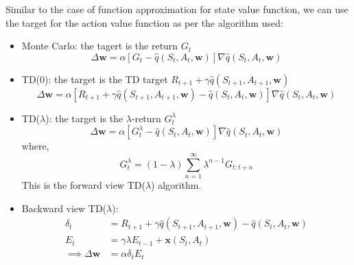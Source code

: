 Similar to the case of function approximation for state value function, we can use the target
for the action value function as per the algorithm used:
\begin{itemize}
    \item Monte Carlo: the tagert is the return \(G_t\)
    \[
        \Delta \mathbf{w} = \alpha \left[ 
            G_t - \hat{q}(S_t,A_t,\mathbf{w})
         \right] \nabla \hat{q}(S_t,A_t,\mathbf{w})  
    \]
    \item TD(0): the target is the TD target \(R_{t+1} + \gamma \hat{q}(S_{t+1},A_{t+1},
    \mathbf{w})\)
    \[
        \Delta \mathbf{w} = \alpha \left[ 
            R_{t+1} + \gamma \hat{q}(S_{t+1},A_{t+1},\mathbf{w}) - \hat{q}(S_t,A_t,
            \mathbf{w})
         \right] \nabla \hat{q}(S_t,A_t,\mathbf{w})
    \]
    \item TD(\(\lambda\)): the target is the \(\lambda\)-return  \(G_t^{\lambda}\)
    \[
        \Delta \mathbf{w} = \alpha \left[ 
            G_t^{\lambda} - \hat{q}(S_t,A_t,\mathbf{w})
         \right] \nabla \hat{q}(S_t,A_t,\mathbf{w})
    \]
    where,
    \[
        G_t^{\lambda} = (1-\lambda) \sum_{n=1}^{\infty} \lambda^{n-1} G_{t:t+n}  
    \]
    This is the forward view TD(\(\lambda\)) algorithm.

    \item Backward view TD(\(\lambda\)):
    \[
        \begin{aligned}
            \delta _t &= R_{t+1} + \gamma \hat{q}(S_{t+1},A_{t+1},\mathbf{w}) - \hat{q}(S_t,
            A_t,\mathbf{w}) \\
            E_t &= \gamma \lambda E_{t-1} + \mathbf{x}(S_t,A_t) \\
            \implies \Delta \mathbf{w} &= \alpha \delta_t E_t
        \end{aligned}
    \]
\end{itemize}